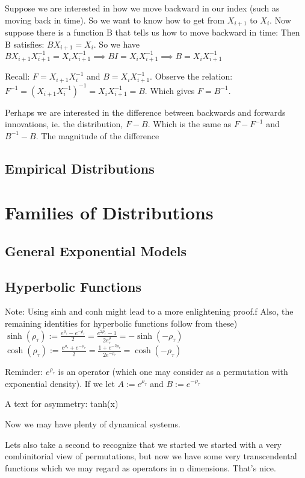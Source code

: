 \documentclass{article}
\theoremstyle{definition}
\begin{document}
Suppose we are interested in how we move backward in our index (such as moving back in time). So we want to know how to get from $X_{i+1}$ to $X_i$. Now suppose there is a function B that tells us how to move backward in time:
Then B satisfies: $BX_{i+1}= X_i$. So we have $BX_{i+1}X_{i+1}^{-1} = X_i X_{i+1}^{-1} \implies B I = X_i X_{i+1}^{-1} \implies  B = X_i X_{i+1}^{-1} $

Recall: $ F = X_{i+1}X_{i}^{-1}$ and $B = X_{i}X_{i+1}^{-1}$. Observe the relation: $F^{-1} = (X_{i+1}X_{i}^{-1})^{-1} = X_{i}X_{i+1}^{-1} = B$. Which gives $F = B^{-1}$.

Perhaps we are interested in the difference between backwards and forwards innovations, ie. the distribution, $F - B$. Which is the same as $F - F^{-1}$ and $B^{-1} - B$. The magnitude of the difference 


\subsection{Empirical Distributions}

\section{Families of Distributions}
\subsection{General Exponential Models}
\subsection{Hyperbolic Functions}
Note: Using sinh and conh might lead to a more enlightening proof.f
Also, the remaining identities for hyperbolic functions follow from these)
$\sinh(\rho_\tau) := \frac{e^{\rho_\tau} - e^{-\rho_\tau}}{2} = \frac{e^{2\rho_\tau} - 1}{2e^\rho_\tau} = -\sinh(-\rho_\tau)$
$\cosh(\rho_\tau) := \frac{e^{\rho_\tau} + e^{-\rho_\tau}}{2} = \frac{1+e^{-2\rho_\tau}}{2e^{-\rho_\tau}}= \cosh(-\rho_\tau)$

Reminder: $e^{\rho_\tau}$ is an operator (which one may consider as a permutation with exponential density). If we let $A := e^{\rho_\tau} $ and $B:= e^{-\rho_\tau}$

A text for asymmetry: tanh(x)

Now we may have plenty of dynamical systems.

Lets also take a second to recognize that we started we started with a very combinitorial view of permutations, but now we have some very transcendental functions which we may regard as operators in n dimensions. That's nice.
\end{document}
